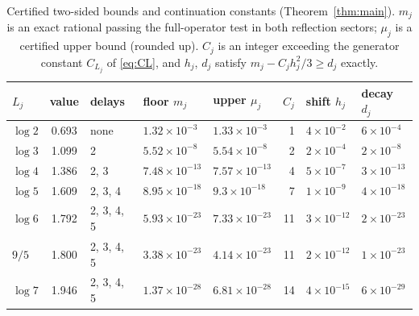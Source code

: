 \begin{table}[ht]
\centering
\caption{Certified two-sided bounds and continuation constants (Theorem~\ref{thm:main}). $m_j$ is an exact rational passing the full-operator test in both reflection sectors; $\mu_j$ is a certified upper bound (rounded up). $C_j$ is an integer exceeding the generator constant $C_{L_j}$ of \eqref{eq:CL}, and $h_j$, $d_j$ satisfy $m_j-C_jh_j^2/3\ge d_j$ exactly.}
\label{tab:main}
\small\setlength{\tabcolsep}{4pt}\begin{tabular}{@{}lclllrll@{}}
\toprule
$L_j$ & value & delays & floor $m_j$ & upper $\mu_j$ & $C_j$ & shift $h_j$ & decay $d_j$\\
\midrule
$\log2$ & 0.693 & none & $1.32\times10^{-3}$ & $1.33\times10^{-3}$ & 1 & $4\times10^{-2}$ & $6\times10^{-4}$\\
$\log3$ & 1.099 & 2 & $5.52\times10^{-8}$ & $5.54\times10^{-8}$ & 2 & $2\times10^{-4}$ & $2\times10^{-8}$\\
$\log4$ & 1.386 & 2, 3 & $7.48\times10^{-13}$ & $7.57\times10^{-13}$ & 4 & $5\times10^{-7}$ & $3\times10^{-13}$\\
$\log5$ & 1.609 & 2, 3, 4 & $8.95\times10^{-18}$ & $9.3\times10^{-18}$ & 7 & $1\times10^{-9}$ & $4\times10^{-18}$\\
$\log6$ & 1.792 & 2, 3, 4, 5 & $5.93\times10^{-23}$ & $7.33\times10^{-23}$ & 11 & $3\times10^{-12}$ & $2\times10^{-23}$\\
$9/5$ & 1.800 & 2, 3, 4, 5 & $3.38\times10^{-23}$ & $4.14\times10^{-23}$ & 11 & $2\times10^{-12}$ & $1\times10^{-23}$\\
$\log7$ & 1.946 & 2, 3, 4, 5 & $1.37\times10^{-28}$ & $6.81\times10^{-28}$ & 14 & $4\times10^{-15}$ & $6\times10^{-29}$\\
\bottomrule
\end{tabular}
\end{table}
